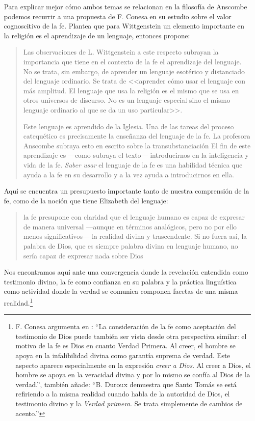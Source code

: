 Para explicar mejor cómo ambos temas se relacionan en la filosofía de Anscombe podemos recurrir a una propuesta de F. Conesa en su estudio sobre el valor cognoscitivo de la fe. Plantea que para Wittgenstein un elemento importante en la religión es el aprendizaje de un lenguaje, entonces propone: \blockquote[{\Cite[310-311]{conesa1994cc}}]{Las observaciones de L. Wittgenstein a este respecto subrayan la importancia que tiene en el contexto de la fe el aprendizaje del lenguaje. No se trata, sin embargo, de aprender un lenguaje esotérico y distanciado del lenguaje ordinario. Se trata de <<aprender cómo usar el lenguaje con más amplitud. El lenguaje que usa la religión es el mismo que se usa en otros universos de discurso. No es un lenguaje especial sino el mismo lenguaje ordinario al que se da un uso particular>>.

Este lenguaje es aprendido de la Iglesia. Una de las tareas del proceso catequético es precisamente la enseñanza del lenguaje de la fe. La profesora Anscombe subraya esto en  escrito sobre la transubstanciación
  \textelp{} El fin de este aprendizaje es ---como subraya el texto--- introducirnos en la inteligencia y vida de la fe. \emph{Saber usar} el lenguaje de la fe es una habilidad técnica que ayuda a la fe en su desarrollo y a la vez ayuda a introducirnos en ella.}

Aquí se encuentra un presupuesto importante tanto de nuestra comprensión de la fe, como de la noción que tiene Elizabeth del lenguaje: \blockquote[][\,(FR 84)]{la fe presupone con claridad que el lenguaje humano es capaz de expresar de manera universal ---aunque en términos analógicos, pero no por ello menos significativos--- la realidad divina y trascendente. Si no fuera así, la palabra de Dios, que es siempre palabra divina en lenguaje humano, no sería capaz de expresar nada sobre Dios}. Nos encontramos aquí ante una convergencia donde la revelación entendida como testimonio divino, la fe como confianza en su palabra y la práctica linguística como actividad donde la verdad se comunica componen facetas de una misma realidad.\footnote{F. Conesa argumenta en \Cite[259]{conesa1994cc}: \enquote{La consideración de la fe como aceptación del testimonio de Dios puede también ser vista desde otra perspectiva similar: el motivo de la fe es Dios en cuanto Verdad Primera. Al creer, el hombre se apoya en la infalibilidad divina como garantía suprema de verdad. Este aspecto aparece especialmente en la expresión \emph{creer a Dios}. Al creer a Dios, el hombre se apoya en la veracidad divina y por lo mismo se confía al Dios de la verdad.}, también añade: \enquote{B. Duroux demuestra que Santo Tomás se está refiriendo a la misma realidad cuando habla de la autoridad de Dios, el testimonio divino y la \emph{Verdad primera}. Se trata simplemente de cambios de acento.}}

